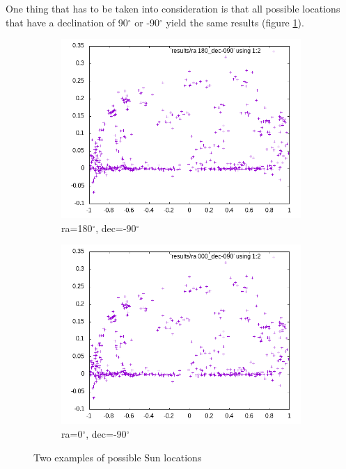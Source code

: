 \clearpage

One thing that has to be taken into consideration is that all possible locations that have a declination of 90$^{\circ}$ or -90$^{\circ}$ yield the same results (figure \ref{fig:poles}).

\begin{figure}[!htb]
	\begin{subfigure}[b]{0.5\textwidth}
		\includegraphics[width=\linewidth]{images/ch4/ra180_dec-090.png}
		\caption{ra=180$^{\circ}$, dec=-90$^{\circ}$}
	\end{subfigure}
	\hfill
	\begin{subfigure}[b]{0.5\textwidth}
		\includegraphics[width=\linewidth]{images/ch4/ra000_dec-090.png}
		\caption{ra=0$^{\circ}$, dec=-90$^{\circ}$}
	\end{subfigure}
	\caption{Two examples of possible Sun locations}
	\label{fig:poles}
\end{figure}


